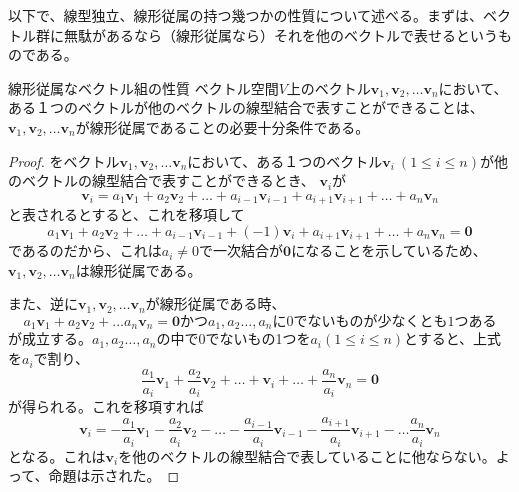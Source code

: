 以下で、線型独立、線形従属の持つ幾つかの性質について述べる。まずは、ベクトル群に無駄があるなら（線形従属なら）それを他のベクトルで表せるというものである。
\begin{theorem*}{線形従属なベクトル組の性質}
	ベクトル空間\(V\)上のベクトル\(\boldsymbol{v}_1,\boldsymbol{v}_2,\dots\boldsymbol{v}_n\)において、ある１つのベクトルが他のベクトルの線型結合で表すことができることは、\(\boldsymbol{v}_1,\boldsymbol{v}_2,\dots\boldsymbol{v}_n\)が線形従属であることの必要十分条件である。
\end{theorem*}
\begin{proof}
	をベクトル\(\boldsymbol{v}_1,\boldsymbol{v}_2,\dots\boldsymbol{v}_n\)において、ある１つのベクトル\(\boldsymbol{v}_i \ (1 \leq i \leq n)\)が他のベクトルの線型結合で表すことができるとき、
	\(\boldsymbol{v}_i\)が
	\begin{equation}
		\boldsymbol{v}_i=a_1\boldsymbol{v}_1+a_2\boldsymbol{v}_2+\dots +  a_{i-1}\boldsymbol{v}_{i-1} +  a_{i+1}\boldsymbol{v}_{i+1}+\dots+a_n\boldsymbol{v}_n
	\end{equation}
	と表されるとすると、これを移項して
	\begin{equation}
		a_1\boldsymbol{v}_1+a_2\boldsymbol{v}_2+\dots +  a_{i-1}\boldsymbol{v}_{i-1}+(-1)\boldsymbol{v}_i+  a_{i+1}\boldsymbol{v}_{i+1}+\dots+a_n\boldsymbol{v}_n=\boldsymbol{0}
	\end{equation}
	であるのだから、これは\(a_i\neq 0\)で一次結合が\(\boldsymbol{0}\)になることを示しているため、\(\boldsymbol{v}_1,\boldsymbol{v}_2,\dots\boldsymbol{v}_n\)は線形従属である。

	また、逆に\(\boldsymbol{v}_1,\boldsymbol{v}_2,\dots\boldsymbol{v}_n\)が線形従属である時、
	\begin{equation}
		a_1\boldsymbol{v}_1+a_2\boldsymbol{v}_2+\dots a_n\boldsymbol{v}_n  =\boldsymbol{0} かつ a_1,a_2\dots,a_nに0でないものが少なくとも1つある
	\end{equation}
	が成立する。\(a_1,a_2\dots,a_n\)の中で\(0\)でないもの1つを\(a_i (1 \leq i \leq n)\)とすると、上式を\(a_i\)で割り、
	\begin{equation}
		\frac{a_1}{a_i}\boldsymbol{v}_1+\frac{a_2}{a_i}\boldsymbol{v}_2+\dots +\boldsymbol{v}_i + \dots   +\frac{a_n}{a_i}\boldsymbol{v}_n=\boldsymbol{0}
	\end{equation}
	が得られる。これを移項すれば
	\begin{equation}
		\boldsymbol{v}_i =-\frac{a_1}{a_i}\boldsymbol{v}_1-\frac{a_2}{a_i}\boldsymbol{v}_2-\dots -\frac{a_{i-1}}{a_i}\boldsymbol{v}_{i-1} -\frac{a_{i+1}}{a_i}\boldsymbol{v}_{i+1}- \dots \frac{a_n}{a_i}\boldsymbol{v}_n
	\end{equation}
	となる。これは\(\boldsymbol{v}_i\)を他のベクトルの線型結合で表していることに他ならない。よって、命題は示された。
\end{proof}
